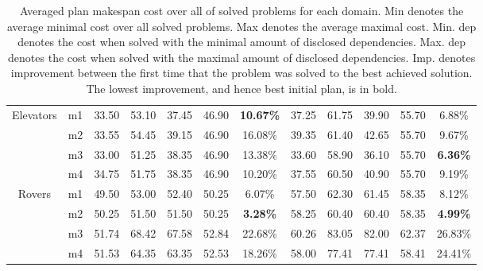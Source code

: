 \documentclass{article}
\theoremstyle{remark}
\begin{document}
\begin{table}[ht!]
{\begin{tabular}{|c|c|c|c|c|c|c||c|c|c|c|c|}
\multirow{4}{*}{Elevators}       & m1                          & 33.50        & 53.10        & 37.45             & 46.90             & \textbf{10.67\%} & 37.25        & 61.75        & 39.90             & 55.70             & 6.88\%          \\ \cline{2-12} 
                                 & m2                          & 33.55        & 54.45        & 39.15             & 46.90             & 16.08\%          & 39.35        & 61.40        & 42.65             & 55.70             & 9.67\%          \\ \cline{2-12} 
                                 & m3                          & 33.00        & 51.25        & 38.35             & 46.90             & 13.38\%          & 33.60        & 58.90        & 36.10             & 55.70             & \textbf{6.36\%} \\ \cline{2-12} 
                                 & m4                          & 34.75        & 51.75        & 38.35             & 46.90             & 10.20\%          & 37.55        & 60.50        & 40.90             & 55.70             & 9.19\%          \\ \hline

\multirow{4}{*}{Rovers}          & m1                          & 49.50        & 53.00        & 52.40             & 50.25             & 6.07\%           & 57.50        & 62.30        & 61.45             & 58.35             & 8.12\%          \\ \cline{2-12} 
                                 & m2                          & 50.25        & 51.50        & 51.50             & 50.25             & \textbf{3.28\%}  & 58.25        & 60.40        & 60.40             & 58.35             & \textbf{4.99\%} \\ \cline{2-12} 
                                 & m3                          & 51.74        & 68.42        & 67.58             & 52.84             & 22.68\%          & 60.26        & 83.05        & 82.00             & 62.37             & 26.83\%         \\ \cline{2-12} 
                                 & m4                          & 51.53        & 64.35        & 63.35             & 52.53             & 18.26\%          & 58.00        & 77.41        & 77.41             & 58.41             & 24.41\%         \\ \hline


\end{tabular}
}
\caption{Averaged plan makespan cost over all of solved problems for each domain. Min denotes the average minimal cost over all solved problems.
Max denotes the average maximal cost.
Min. dep denotes the cost when solved with the minimal amount of disclosed dependencies.
Max. dep denotes the cost when solved with the maximal amount of disclosed dependencies.
Imp. denotes improvement between the first time that the problem was solved to the best achieved solution.
The lowest improvement, and hence best initial plan, is in bold.}
\label{table:costTable}
\end{table}
\end{document}
